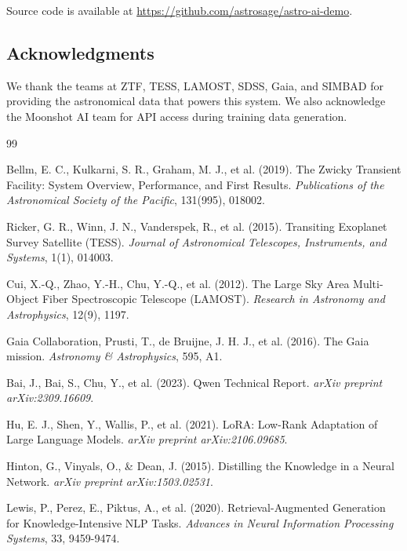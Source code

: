 \documentclass[11pt,a4paper]{article}
\begin{document}
Source code is available at \url{https://github.com/astrosage/astro-ai-demo}.

\subsection*{Acknowledgments}

We thank the teams at ZTF, TESS, LAMOST, SDSS, Gaia, and SIMBAD for providing the astronomical data that powers this system. We also acknowledge the Moonshot AI team for API access during training data generation.

\begin{thebibliography}{99}

Bellm, E. C., Kulkarni, S. R., Graham, M. J., et al. (2019).
The Zwicky Transient Facility: System Overview, Performance, and First Results.
\textit{Publications of the Astronomical Society of the Pacific}, 131(995), 018002.

Ricker, G. R., Winn, J. N., Vanderspek, R., et al. (2015).
Transiting Exoplanet Survey Satellite (TESS).
\textit{Journal of Astronomical Telescopes, Instruments, and Systems}, 1(1), 014003.

Cui, X.-Q., Zhao, Y.-H., Chu, Y.-Q., et al. (2012).
The Large Sky Area Multi-Object Fiber Spectroscopic Telescope (LAMOST).
\textit{Research in Astronomy and Astrophysics}, 12(9), 1197.

Gaia Collaboration, Prusti, T., de Bruijne, J. H. J., et al. (2016).
The Gaia mission.
\textit{Astronomy \& Astrophysics}, 595, A1.

Bai, J., Bai, S., Chu, Y., et al. (2023).
Qwen Technical Report.
\textit{arXiv preprint arXiv:2309.16609}.

Hu, E. J., Shen, Y., Wallis, P., et al. (2021).
LoRA: Low-Rank Adaptation of Large Language Models.
\textit{arXiv preprint arXiv:2106.09685}.

Hinton, G., Vinyals, O., \& Dean, J. (2015).
Distilling the Knowledge in a Neural Network.
\textit{arXiv preprint arXiv:1503.02531}.

Lewis, P., Perez, E., Piktus, A., et al. (2020).
Retrieval-Augmented Generation for Knowledge-Intensive NLP Tasks.
\textit{Advances in Neural Information Processing Systems}, 33, 9459-9474.


\end{thebibliography}
\end{document}
